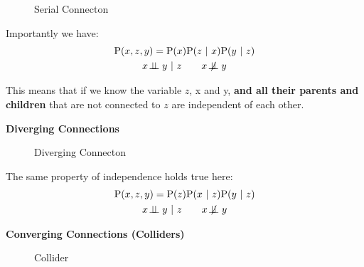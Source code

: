 \documentclass{article}
\newcommand{\prob}{\text{P}}
\newcommand{\pr}{\prob}
\newcommand{\giv}{\ |\ }
\newcommand\indep{\!\perp\!\!\!\perp}
\newcommand\notindep{\not\!\perp\!\!\!\perp}
\begin{document}
\begin{figure}[h]
    \centering
    \caption{Serial Connecton}
    \label{fig:serial}
\end{figure}

Importantly we have:
\begin{gather*}
    \pr(x, z, y) = \pr(x) \pr(z \giv x) \pr(y \giv z) \\
    x \indep y \giv z \quad\quad x \notindep y
\end{gather*}

This means that if we know the variable $z$, x and y, \textbf{and all their parents and children} that are not connected to $z$ are independent of each other.

\textbf{Diverging Connections}
\begin{figure}[h]
    \centering
    \caption{Diverging Connecton}
    \label{fig:divering}
\end{figure}

The same property of independence holds true here:
\begin{gather*}
    \pr(x, z, y) = \pr(z) \pr(x \giv z) \pr(y \giv z) \\
    x \indep y \giv z \quad\quad x \notindep y
\end{gather*}

\textbf{Converging Connections (Colliders)}
\begin{figure}[h!]
    \centering
    \caption{Collider}
    \label{fig:collider}
\end{figure}
\end{document}
